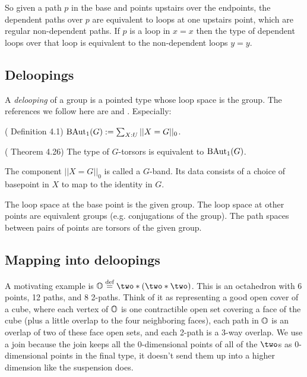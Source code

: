 \documentclass[12pt]{article}
\begin{document}
So given a path \( p \) in the base and points upstairs over the endpoints, the dependent paths over \( p \) are equivalent to loops at one upstairs point, which are regular non-dependent paths. If \( p \) is a loop in \( x=x \) then the type of dependent loops over that loop is equivalent to the non-dependent loops \( y=y \).

\subsection{Deloopings}

A \emph{delooping} of a group is a pointed type whose loop space is the group. The references we follow here are \cite{Symmetry} and \cite{buchholtz2023central}. Especially:

\begin{mydef}
 (\cite{buchholtz2023central} Definition 4.1) \( \mathrm{BAut}_1(G):=\sum_{X:U}||X=G||_0 \).
\end{mydef}

\begin{mythm}
(\cite{buchholtz2023central} Theorem 4.26) The type of \( G \)-torsors is equivalent to \( \mathrm{BAut}_1(G) \).
\end{mythm}

The component \( ||X=G||_0 \) is called a \( G \)-band. Its data consists of a choice of basepoint in \( X \) to map to the identity in \( G \).

The loop space at the base point is the given group. The loop space at other points are equivalent groups (e.g. conjugations of the group). The path spaces between pairs of points are torsors of the given group.

\subsection{Mapping into deloopings}

A motivating example is \( \oo\defeq\two\join(\two\join\two) \). This is an octahedron with 6 points, 12 paths, and 8 2-paths. Think of it as representing a good open cover of a cube, where each vertex of \( \mathbb{O} \) is one contractible open set covering a face of the cube (plus a little overlap to the four neighboring faces), each path in \( \mathbb{O} \) is an overlap of two of these face open sets, and each 2-path is a 3-way overlap. We use a join because the join keeps all the 0-dimensional points of all of the \( \two \)s as 0-dimensional points in the final type, it doesn't send them up into a higher dimension like the suspension does.
\end{document}
